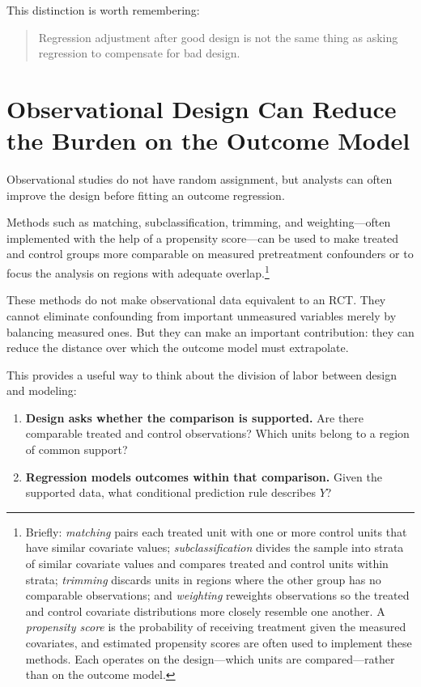 \documentclass[11pt]{report}
\begin{document}
This distinction is worth remembering:

\begin{quote}
Regression adjustment after good design is not the same thing as asking regression to compensate for bad design.
\end{quote}

\section{Observational Design Can Reduce the Burden on the Outcome Model}

Observational studies do not have random assignment, but analysts can often improve the design before fitting an outcome regression.

Methods such as matching, subclassification, trimming, and weighting---often implemented with the help of a propensity score---can be used to make treated and control groups more comparable on measured pretreatment confounders or to focus the analysis on regions with adequate overlap.\footnote{Briefly: \emph{matching} pairs each treated unit with one or more control units that have similar covariate values; \emph{subclassification} divides the sample into strata of similar covariate values and compares treated and control units within strata; \emph{trimming} discards units in regions where the other group has no comparable observations; and \emph{weighting} reweights observations so the treated and control covariate distributions more closely resemble one another. A \emph{propensity score} is the probability of receiving treatment given the measured covariates, and estimated propensity scores are often used to implement these methods. Each operates on the design---which units are compared---rather than on the outcome model.}

These methods do not make observational data equivalent to an RCT. They cannot eliminate confounding from important unmeasured variables merely by balancing measured ones. But they can make an important contribution: they can reduce the distance over which the outcome model must extrapolate.

This provides a useful way to think about the division of labor between design and modeling:

\begin{enumerate}
    \item \textbf{Design asks whether the comparison is supported.} Are there comparable treated and control observations? Which units belong to a region of common support?
    \item \textbf{Regression models outcomes within that comparison.} Given the supported data, what conditional prediction rule describes \(Y\)?
\end{enumerate}
\end{document}
